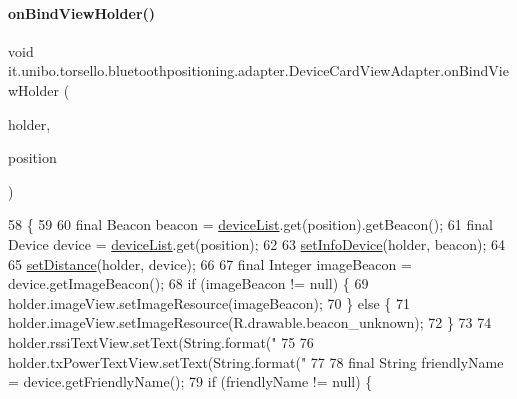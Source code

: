 \paragraph{\texorpdfstring{on\+Bind\+View\+Holder()}{onBindViewHolder()}}
{\footnotesize\ttfamily void it.\+unibo.\+torsello.\+bluetoothpositioning.\+adapter.\+Device\+Card\+View\+Adapter.\+on\+Bind\+View\+Holder (\begin{DoxyParamCaption}\item[{\hyperlink{classit_1_1unibo_1_1torsello_1_1bluetoothpositioning_1_1adapter_1_1DeviceCardViewAdapter_1_1DeviceViewHolder}{Device\+View\+Holder}}]{holder,  }\item[{final int}]{position }\end{DoxyParamCaption})}


\begin{DoxyCode}
58                                                                               \{
59 
60         \textcolor{keyword}{final} Beacon beacon = \hyperlink{classit_1_1unibo_1_1torsello_1_1bluetoothpositioning_1_1adapter_1_1DeviceCardViewAdapter_a72413f87c723c585bd1ad9bc5711cf39_a72413f87c723c585bd1ad9bc5711cf39}{deviceList}.get(position).getBeacon();
61         \textcolor{keyword}{final} Device device = \hyperlink{classit_1_1unibo_1_1torsello_1_1bluetoothpositioning_1_1adapter_1_1DeviceCardViewAdapter_a72413f87c723c585bd1ad9bc5711cf39_a72413f87c723c585bd1ad9bc5711cf39}{deviceList}.get(position);
62 
63         \hyperlink{classit_1_1unibo_1_1torsello_1_1bluetoothpositioning_1_1adapter_1_1DeviceCardViewAdapter_aa43ee1f594b3489f6e9e4b8e20ea1612_aa43ee1f594b3489f6e9e4b8e20ea1612}{setInfoDevice}(holder, beacon);
64 
65         \hyperlink{classit_1_1unibo_1_1torsello_1_1bluetoothpositioning_1_1adapter_1_1DeviceCardViewAdapter_a8d5baa2d386a92ba4fb20b71e6e517f9_a8d5baa2d386a92ba4fb20b71e6e517f9}{setDistance}(holder, device);
66 
67         \textcolor{keyword}{final} Integer imageBeacon = device.getImageBeacon();
68         \textcolor{keywordflow}{if} (imageBeacon != null) \{
69             holder.imageView.setImageResource(imageBeacon);
70         \} \textcolor{keywordflow}{else} \{
71             holder.imageView.setImageResource(R.drawable.beacon\_unknown);
72         \}
73 
74         holder.rssiTextView.setText(String.format(\textcolor{stringliteral}{"%
75 
76         holder.txPowerTextView.setText(String.format(\textcolor{stringliteral}{"%
77 
78         \textcolor{keyword}{final} String friendlyName = device.getFriendlyName();
79         \textcolor{keywordflow}{if} (friendlyName != null) \{
}}
\end{DoxyCode}
